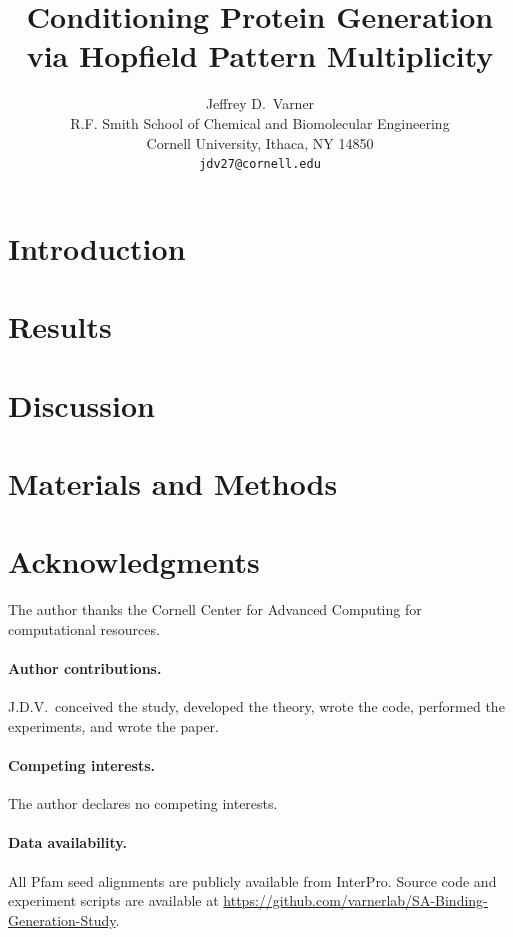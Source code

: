 \documentclass{article}
\title{Conditioning Protein Generation via Hopfield Pattern Multiplicity}
\author{%
  Jeffrey D.~Varner \\
  R.F. Smith School of Chemical and Biomolecular Engineering\\
  Cornell University, Ithaca, NY 14850 \\
  \texttt{jdv27@cornell.edu} \\
}
\theoremstyle{definition}
\theoremstyle{remark}
\begin{document}
\maketitle

\begin{abstract}

\end{abstract}


\section{Introduction}


\section{Results}


\section{Discussion}


\section{Materials and Methods}



\section*{Acknowledgments}
The author thanks the Cornell Center for Advanced Computing for computational resources.

\paragraph{Author contributions.}
J.D.V.\ conceived the study, developed the theory, wrote the code, performed the experiments, and wrote the paper.

\paragraph{Competing interests.}
The author declares no competing interests.

\paragraph{Data availability.}
All Pfam seed alignments are publicly available from InterPro. Source code and experiment scripts
are available at \url{https://github.com/varnerlab/SA-Binding-Generation-Study}.
\end{document}
